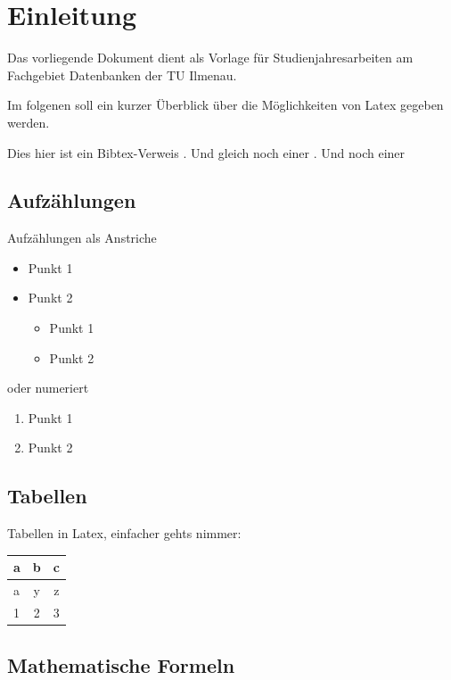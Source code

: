 \chapter{Einleitung}

Das vorliegende Dokument dient als Vorlage für Studienjahresarbeiten am Fachgebiet Datenbanken der TU Ilmenau.

Im folgenen soll ein kurzer Überblick über die Möglichkeiten von Latex gegeben werden.

Dies hier ist ein Bibtex-Verweis \cite{CGM02}. 
Und gleich noch einer \cite{BHG87}. Und noch einer \cite{PL91}

\section{Aufzählungen}

Aufzählungen als Anstriche 
\begin{itemize}
\item Punkt 1
\item Punkt 2
	\begin{itemize}
	\item Punkt 1
	\item Punkt 2
	\end{itemize}
\end{itemize}

oder numeriert
\begin{enumerate}
\item Punkt 1
\item Punkt 2
\end{enumerate}

\section{Tabellen}

Tabellen in Latex, einfacher gehts nimmer:

\begin{center}
\begin{tabular}{|l|cc|}
\hline
\hline
a & b & c \\
\hline
\hline
a & y  & z \\
\hline
1 & 2 & 3 \\
\hline
\hline
\end{tabular}
\end{center}



\section{Mathematische Formeln}

